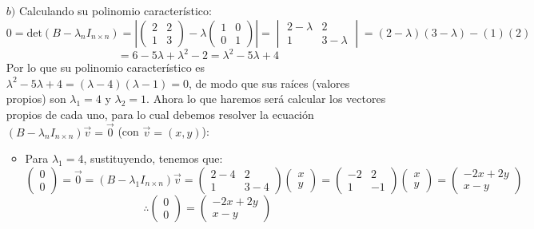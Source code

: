 \begin{itemize}
\begin{enumerate}
\begin{itemize}
    
\end{itemize}
        \item[$b)$] Calculando su polinomio caracter\'istico:
        \[0=\text{det}(B-\lambda_nI_{n\times n })=\left|\begin{pmatrix}
2&2\\
1 &3
\end{pmatrix}-\lambda\begin{pmatrix}
1 &0\\0 &1
\end{pmatrix}\right|=\begin{vmatrix}2-\lambda &2\\
1 &3-\lambda\end{vmatrix}=(2-\lambda)(3-\lambda)-(1)(2)\]\[=6-5\lambda+\lambda^2-2=\lambda^2-5\lambda+4\]
Por lo que su polinomio caracter\'istico es $\lambda^2-5\lambda+4=(\lambda-4)(\lambda-1)=0$, de modo que sus ra\'ices (valores propios) son $\lambda_1=4$ y $\lambda_2=1$. Ahora lo que haremos ser\'a calcular los vectores propios de cada uno, para lo cual debemos resolver la ecuaci\'on $(B-\lambda_nI_{n\times n })\vec{v}=\vec{0}$ (con $\vec{v}=(x,y)$):
\begin{itemize}
    \item Para $\lambda_1=4$, sustituyendo, tenemos que:
    \[\begin{pmatrix}0\\
0\end{pmatrix}=\vec{0}=(B-\lambda_1I_{n\times n })\vec{v}=\begin{pmatrix}2-4 &2\\
1 &3-4\end{pmatrix}\begin{pmatrix}x\\
y\end{pmatrix}=\begin{pmatrix}-2 &2\\
1 &-1\end{pmatrix}\begin{pmatrix}x\\
y\end{pmatrix}=\begin{pmatrix}-2x+2y\\
x-y\end{pmatrix}\]
\[\therefore \begin{pmatrix}0\\
0\end{pmatrix}=\begin{pmatrix}-2x+2y\\
x-y\end{pmatrix}\]

\end{itemize}
\end{enumerate}
\end{itemize}
